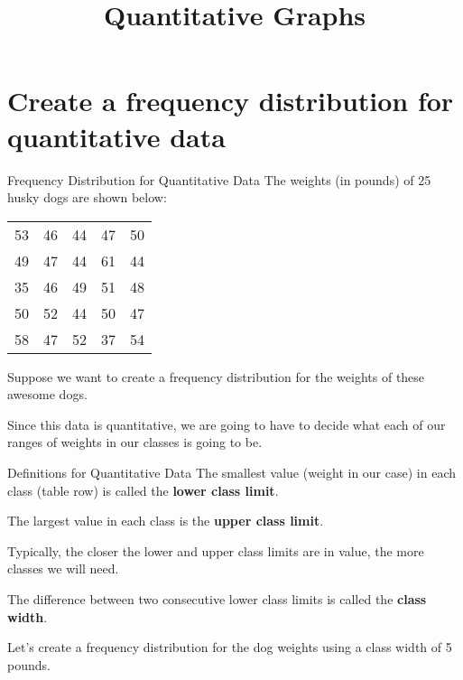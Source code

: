 \documentclass[t]{beamer}
\title{Quantitative Graphs}
\author{}
\date{}
\begin{document}
\begin{frame} 
\maketitle
\end{frame}

\section{Create a frequency distribution for quantitative data}

\begin{frame}{Frequency Distribution for Quantitative Data}
The weights (in pounds) of 25 husky dogs are shown below:
\begin{center}
\begin{tabular}{ccccc}
53 & 46 & 44 & 47 & 50 \\
49 & 47 & 44 & 61 & 44 \\
35 & 46 & 49 & 51 & 48 \\
50 & 52 & 44 & 50 & 47 \\
58 & 47 & 52 & 37 & 54 \\
\end{tabular}
\end{center}
Suppose we want to create a frequency distribution for the weights of these awesome dogs. \newline\\	\pause

Since this data is quantitative, we are going to have to decide what each of our ranges of weights in our classes is going to be. 
\end{frame}

\begin{frame}{Definitions for Quantitative Data}
The smallest value (weight in our case) in each class (table row) is called the {\color{blue}\textbf{lower class limit}}. \newline\\	\pause

The largest value in each class is the {\color{blue}\textbf{upper class limit}}. \newline\\ \pause 

Typically, the closer the lower and upper class limits are in value, the more classes we will need. \newline\\	\pause

The difference between two consecutive lower class limits is called the {\color{blue}\textbf{class width}}.	\newline\\	\pause

Let's create a frequency distribution for the dog weights using a class width of 5 pounds.
\end{frame}
\end{document}
